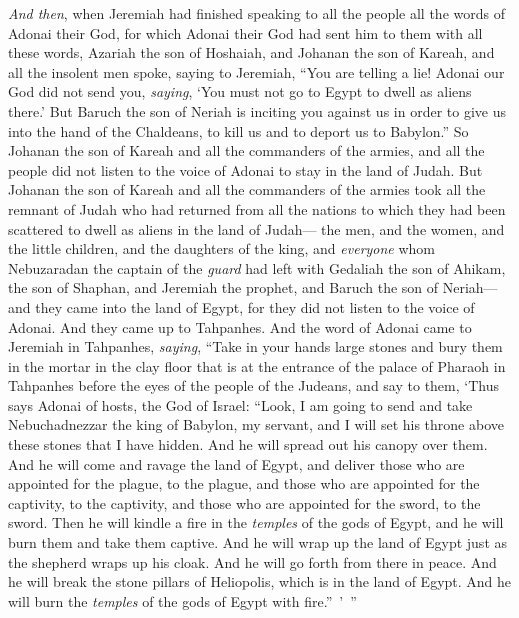 \begin{biblechapter} %
\verse \textit{And then}, when Jeremiah had finished speaking to all the people all the words of Adonai their God, for which Adonai their God had sent him to them with all these words,
\verse Azariah the son of Hoshaiah, and Johanan the son of Kareah, and all the insolent men spoke, saying to Jeremiah, “You are telling a lie! Adonai our God did not send you, \textit{saying}, ‘You must not go to Egypt to dwell as aliens there.’
\verse But Baruch the son of Neriah is inciting you against us in order to give us into the hand of the Chaldeans, to kill us and to deport us to Babylon.”
\verse So Johanan the son of Kareah and all the commanders of the armies, and all the people did not listen to the voice of Adonai to stay in the land of Judah.
\verse But Johanan the son of Kareah and all the commanders of the armies took all the remnant of Judah who had returned from all the nations to which they had been scattered to dwell as aliens in the land of Judah—
\verse the men, and the women, and the little children, and the daughters of the king, and \textit{everyone} whom Nebuzaradan the captain of the \textit{guard} had left with Gedaliah the son of Ahikam, the son of Shaphan, and Jeremiah the prophet, and Baruch the son of Neriah—
\verse and they came into the land of Egypt, for they did not listen to the voice of Adonai. And they came up to Tahpanhes.
 And the word of Adonai came to Jeremiah in Tahpanhes, \textit{saying},
\verse “Take in your hands large stones and bury them in the mortar in the clay floor that is at the entrance of the palace of Pharaoh in Tahpanhes before the eyes of the people of the Judeans,
\verse and say to them, ‘Thus says Adonai of hosts, the God of Israel: “Look, I am going to send and take Nebuchadnezzar the king of Babylon, my servant, and I will set his throne above these stones that I have hidden. And he will spread out his canopy over them.
\verse And he will come and ravage the land of Egypt, and deliver those who are appointed for the plague, to the plague, and those who are appointed for the captivity, to the captivity, and those who are appointed for the sword, to the sword.
\verse Then he will kindle a fire in the \textit{temples} of the gods of Egypt, and he will burn them and take them captive. And he will wrap up the land of Egypt just as the shepherd wraps up his cloak. And he will go forth from there in peace.
\verse And he will break the stone pillars of Heliopolis, which is in the land of Egypt. And he will burn the \textit{temples} of the gods of Egypt with fire.” ’ ”
\end{biblechapter}


